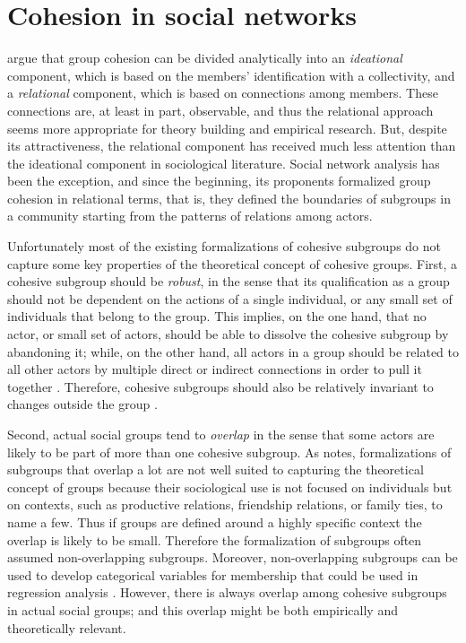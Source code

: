 \section{Cohesion in social networks}

\citet{doreian:1998} argue that group cohesion can be divided analytically into an \emph{ideational} component, which is based on the members' identification with a collectivity, and a \emph{relational} component, which is based on connections among members. These connections are, at least in part, observable, and thus the relational approach seems more appropriate for theory building and empirical research. But, despite its attractiveness, the relational component has received much less attention than the ideational component in sociological literature. Social network analysis has been the exception, and since the beginning, its proponents formalized group cohesion in relational terms, that is, they defined the boundaries of subgroups in a community starting from the patterns of relations among actors.

Unfortunately most of the existing formalizations of cohesive subgroups do not capture some key properties of the theoretical concept of cohesive groups. First, a cohesive subgroup should be \emph{robust}, in the sense that its qualification as a group should not be dependent on the actions of a single individual, or any small set of individuals that belong to the group. This implies, on the one hand, that no actor, or small set of actors, should be able to dissolve the cohesive subgroup by abandoning it; while, on the other hand, all actors in a group should be related to all other actors by multiple direct or indirect connections in order to pull it together \citep{white:2001,moody:2003}. Therefore, cohesive subgroups should also be relatively invariant to changes outside the group \citep[chapter 6]{brandes:2005}.

Second, actual social groups tend to  \emph{overlap} in the sense that some actors are likely to be part of more than one cohesive subgroup. As \citet{freeman:1992} notes, formalizations of subgroups that overlap a lot are not well suited to capturing the theoretical concept of groups because their sociological use is not focused on individuals but on contexts, such as productive relations, friendship relations, or family ties, to name a few. Thus if groups are defined around a highly specific context the overlap is likely to be small. Therefore the formalization of subgroups often assumed non-overlapping subgroups. Moreover, non-overlapping subgroups can be used to develop categorical variables for membership that could be used in regression analysis \citep{borgatti:1990}. However, there is always overlap among cohesive subgroups in actual social groups; and this overlap might be both empirically and theoretically relevant.

